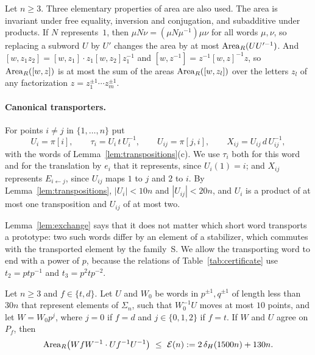 Let $n\ge3$. Three elementary properties of area are also used. The area is invariant under free equality, inversion and conjugation, and
subadditive under products. If $N$ represents~$1$, then $\mu N\nu=(\mu N\mu^{-1})\mu\nu$ for all words $\mu,\nu$, so replacing a subword $U$ by
$U'$ changes the area by at most $\operatorname{Area}_R(UU'^{-1})$. And $[w,z_1z_2]=[w,z_1]\cdot z_1[w,z_2]z_1^{-1}$ and $[w,z^{-1}]=z^{-1}[w,z]^{-1}z$, so
$\operatorname{Area}_R([w,z])$ is at most the sum of the areas $\operatorname{Area}_R([w,z_l])$ over the letters $z_l$ of any factorization $z=z_1^{\pm1}\cdots z_m^{\pm1}$.

\paragraph{Canonical transporters.} For points $i\ne j$ in $\{1,\dots,n\}$ put
\[
U_i=\pi[i],\qquad \tau_i=U_i\,t\,U_i^{-1},\qquad U_{ij}=\pi[j,i],\qquad X_{ij}=U_{ij}\,d\,U_{ij}^{-1},
\]
with the words of Lemma~\ref{lem:transpositions}(c). We use $\tau_i$ both for this word and for the translation by $e_i$ that it represents, since
$U_i(1)=i$; and $X_{ij}$ represents $E_{i\leftarrow j}$, since $U_{ij}$ maps $1$ to $j$ and $2$ to $i$. By Lemma~\ref{lem:transpositions},
$|U_i|<10n$ and $|U_{ij}|<20n$, and $U_i$ is a product of at most one transposition and $U_{ij}$ of at most two.

Lemma~\ref{lem:exchange} says that it does not matter which short word transports a prototype: two such words differ by an element of a
stabilizer, which commutes with the transported element by the family~\textsf{S}. We allow the transporting word to end with a power of $p$,
because the relations of Table~\ref{tab:certificate} use $t_2=ptp^{-1}$ and $t_3=p^2tp^{-2}$.

\begin{lemma}\label{lem:exchange}
Let $n\ge3$ and $f\in\{t,d\}$. Let $U$ and $W_0$ be words in $p^{\pm1},q^{\pm1}$ of length less than $30n$ that represent elements of $\Sigma_n$,
such that $W_0^{-1}U$ moves at most $10$ points, and let $W=W_0p^j$, where $j=0$ if $f=d$ and $j\in\{0,1,2\}$ if $f=t$. If $W$ and $U$ agree
on $P_f$, then
\[
\operatorname{Area}_R\bigl(WfW^{-1}\cdot Uf^{-1}U^{-1}\bigr)\ \le\ \mathcal E(n):=2\,\delta_H(1500n)+130n .
\]
\end{lemma}

